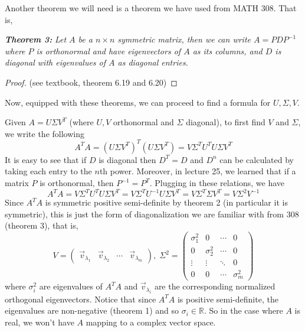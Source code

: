 \documentclass{article}
\begin{document}
Another theorem we will need is a theorem we have used from MATH 308. That is, 
\bigskip

\textit{\textbf{Theorem 3:}} \textit{Let $A$ be a $n \times n $ symmetric matrix, then we can write $A= P D P^{-1}$ where $P$ is orthonormal and have eigenvectors of $A$ as its columns, and $D$ is diagonal with eigenvalues of $A$ as diagonal entries.}

\begin{proof}
(see textbook, theorem 6.19 and 6.20)
\end{proof}
\bigskip 

Now, equipped with these theorems, we can proceed to find a formula for $U, \Sigma, V$. 
\bigskip

Given $A= U \Sigma V^T$ (where $U,V$ orthonormal and $\Sigma$ diagonal), to first find $V$ and $\Sigma$, we write the following 
$$A^TA = ( U \Sigma V^T)^T ( U \Sigma V^T) = V \Sigma^T U^T U \Sigma V^T$$
It is easy to see that if $D$ is diagonal then $D^T = D$ and $D^n$ can be calculated by taking each entry to the $n$th power. Moreover, in lecture 25, we learned that if a matrix $P$ is orthonormal, then $P^{-1} = P^T$. Plugging in these relations, we have 
$$A^TA =V \Sigma^T U^T U \Sigma V^T = V \Sigma^T U^{-1} U \Sigma V^T =V \Sigma^T  \Sigma V^T = V \Sigma^2 V^{-1}$$
Since $A^TA$ is symmetric positive semi-definite by theorem 2 (in particular it is symmetric), this is just the form of diagonalization we are familiar with from 308 (theorem 3), that is, $$V = \begin{pmatrix} \vec{v}_{\lambda_1} & \vec{v}_{\lambda_2} & \cdots & \vec{v}_{\lambda_m} \end{pmatrix}, \; \Sigma^2 = \begin{pmatrix} \sigma^2_1 & 0&  \cdots & 0 \\ 0& \sigma^2_2 &\cdots & 0 \\ \vdots & \vdots & \ddots &0 \\
0 &0& \cdots & \sigma^2_m  \end{pmatrix}$$ 
where $\sigma^2_i$ are eigenvalues of $A^TA$ and $\vec{v}_{\lambda_i}$ are the corresponding normalized orthogonal eigenvectors. Notice that since $A^TA$ is positive semi-definite, the eigenvalues are non-negative (theorem 1) and so $\sigma_i \in \mathbb{R}$. So in the case where $A$ is real, we won't have $A$ mapping to a complex vector space. 
\bigskip
\end{document}
